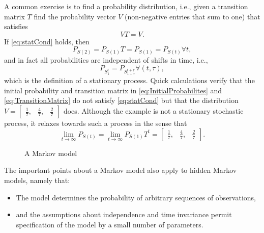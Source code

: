 \documentclass[]{article}
\newcommand{\ts}[3]{#1_{#2}^{#3}}                    %
\newcommand{\ti}[2]{{#1}{(#2)}}                  %
\newcommand{\ie}{i.e.\xspace}
\newcommand{\plotsize}{%
  \fontsize{9}{9}%
  \selectfont}
\renewcommand{\comment}[1]{}
\begin{document}
A common exercise is to find a \emph{} probability
distribution, \ie, given a transition matrix $T$ find the probability
vector $V$ (non-negative entries that sum to one) that satisfies
\begin{equation}
  \label{eq:statCond}
  VT = V.
\end{equation}
If \eqref{eq:statCond} holds, then
\begin{equation*}
  P_{\ti{S}{2}}  = P_{\ti{S}{1}}T = P_{\ti{S}{1}} = P_{\ti{S}{t}}
  \forall t,
\end{equation*}
and in fact all probabilities are independent of shifts in time, \ie,
\begin{equation*}
  P_{\ts{S}{1}{t}} = P_{\ts{S}{1+\tau}{t+\tau}} \forall (t,\tau),
\end{equation*}
which is the definition of a stationary process.  Quick calculations
verify that the initial probability and transition matrix in
\eqref{eq:InitialProbabilites} and \eqref{eq:TransitionMatrix} do not
satisfy \eqref{eq:statCond} but that the distribution $V =
\begin{bmatrix} \frac{1}{7}, & \frac{4}{7}, & \frac{2}{7}
\end{bmatrix}$ does.  Although the example is not a stationary
stochastic process, it relaxes towards such a process in the sense
that
\begin{equation*}
  \lim_{t \rightarrow \infty} P_{\ti{S}{t}} =  \lim_{t \rightarrow
    \infty} P_{\ti{S}{1}} T^t = \begin{bmatrix} \frac{1}{7}, & \frac{4}{7}, & \frac{2}{7}
\end{bmatrix}.
\end{equation*}

\begin{figure}[htbp]
  \centering{\plotsize%
    
  }
  \caption[\comment{fig:Markov }A Markov model.]{A Markov model}
  \label{fig:mm}
\end{figure}

The important points about a Markov model also apply to hidden
Markov models, namely that:
\begin{itemize}
\item The model determines the probability of arbitrary sequences of
  observations,
\item and the assumptions about independence and time invariance
  permit specification of the model by a small number of parameters.
\end{itemize}
\end{document}

